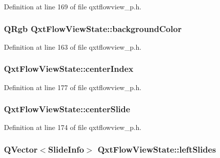 Definition at line 169 of file qxtflowview\-\_\-p.\-h.

\hypertarget{class_qxt_flow_view_state_a2dd86ff04aca360d87e10f1b4bafb9a8}{
\subsubsection[{background\-Color}]{\setlength{\rightskip}{0pt plus 5cm}Q\-Rgb Qxt\-Flow\-View\-State\-::background\-Color}}\label{class_qxt_flow_view_state_a2dd86ff04aca360d87e10f1b4bafb9a8}


Definition at line 163 of file qxtflowview\-\_\-p.\-h.

\hypertarget{class_qxt_flow_view_state_a3b0c0becb59a58e5fc69b9c55a12716a}{
\subsubsection[{center\-Index}]{ Qxt\-Flow\-View\-State\-::center\-Index}}\label{class_qxt_flow_view_state_a3b0c0becb59a58e5fc69b9c55a12716a}


Definition at line 177 of file qxtflowview\-\_\-p.\-h.

\hypertarget{class_qxt_flow_view_state_a1507fe243c77c752d0e26b36f9c40687}{
\subsubsection[{center\-Slide}]{ Qxt\-Flow\-View\-State\-::center\-Slide}}\label{class_qxt_flow_view_state_a1507fe243c77c752d0e26b36f9c40687}


Definition at line 174 of file qxtflowview\-\_\-p.\-h.

\hypertarget{class_qxt_flow_view_state_a449b621c06c13e72b4a8a76061236487}{
\subsubsection[{left\-Slides}]{\setlength{\rightskip}{0pt plus 5cm}Q\-Vector$<${\bf Slide\-Info}$>$ Qxt\-Flow\-View\-State\-::left\-Slides}}\label{class_qxt_flow_view_state_a449b621c06c13e72b4a8a76061236487}


